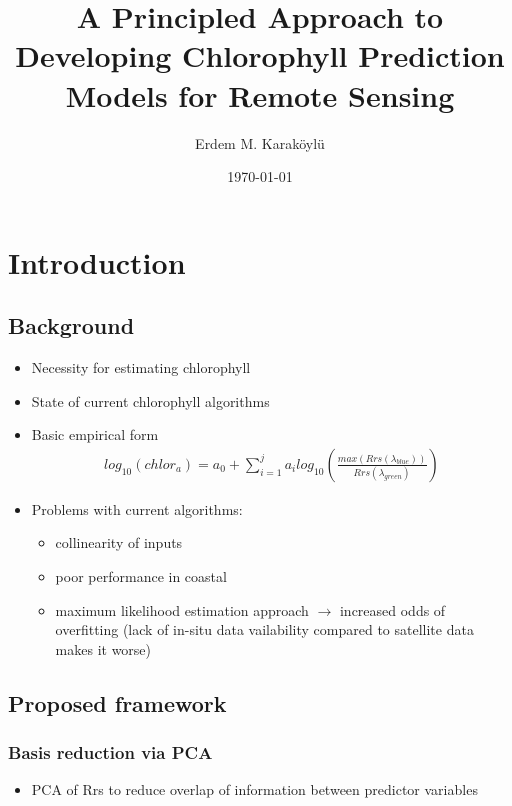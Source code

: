 \documentclass[10pt]{article}
\begin{document}
\author{Erdem M. Karaköylü}
\title{A Principled Approach to Developing Chlorophyll Prediction Models for Remote Sensing}
\date{\today}
\maketitle
\tableofcontents
\newpage

\newcommand{\reddash}{\raisebox{2pt}{\tikz{\draw[-,red,dashed,line width=1.2pt](0,0) -- (5mm,0);}}}
\newcommand{\blkdash}{\raisebox{2pt}{\tikz{\draw[-,black,dashed,line width=1.2pt](0,0) -- (5mm,0);}}}
\newcommand{\blksold}{\raisebox{2pt}{\tikz{\draw[-,black,solid,line width=1.2pt](0,0) -- (5mm,0);}}}

\section{Introduction}
	\subsection{Background}
		\begin{itemize}
		\item Necessity for estimating chlorophyll
		\item State of current chlorophyll algorithms
		\item Basic empirical form
		\begin{align}
		log_{10}\left(chlor_a\right) = a_0 + \sum_{i=1}^ja_ilog_{10}\left(\frac{max\left(Rrs	\left(\lambda_{blue}\right)\right)}{Rrs\left(\lambda_{green}\right)}\right)
		\end{align}
		\item Problems with current algorithms:
		\begin{itemize}
			\item collinearity of inputs
			\item poor performance in coastal
			\item maximum likelihood estimation approach $\rightarrow$ increased odds of overfitting (lack of in-situ data vailability  compared to satellite data makes it worse)
		\end{itemize}
	\end{itemize}
	\subsection{Proposed framework}
		\subsubsection{Basis reduction via PCA}
		\begin{itemize}
			\item PCA of Rrs to reduce overlap of information between predictor variables
		\end{itemize}
\end{document}
